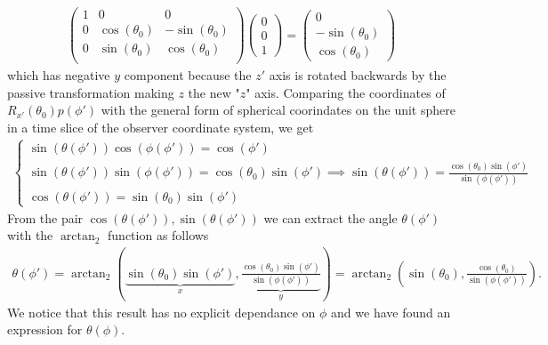 \documentclass[10pt, a4paper]{article}
\begin{document}
\begin{align*}
  \begin{pmatrix}
    1 & 0 & 0\\
    0 & \cos(\theta_0) & -\sin(\theta_0)\\
    0 & \sin(\theta_0) & \cos(\theta_0)\\
  \end{pmatrix}
  \begin{pmatrix}
    0\\
    0\\
    1
  \end{pmatrix}
  =
  \begin{pmatrix}
    0\\
    -\sin(\theta_0)\\
     \cos(\theta_0)
  \end{pmatrix}
\end{align*}
which has negative $y$ component because the $z'$ axis is rotated backwards by the passive transformation making $z$ the new "$z$" axis. Comparing the coordinates of $R_{x'}(\theta_0) p(\phi')$ with the general form of spherical coorindates on the unit sphere in a time slice of the observer coordinate system, we get
\begin{align*}
  \begin{cases}
    \sin(\theta(\phi'))\cos(\phi(\phi')) = \cos(\phi')\\
    \sin(\theta(\phi'))\sin(\phi(\phi')) = \cos(\theta_0)\sin(\phi') \implies \sin(\theta(\phi')) = \frac{\cos(\theta_0)\sin(\phi')}{\sin(\phi(\phi'))} \\
    \cos(\theta(\phi')) = \sin(\theta_0)\sin(\phi')
  \end{cases}
\end{align*}
From the pair $\cos(\theta(\phi')), \sin(\theta(\phi'))$ we can extract the angle $\theta(\phi')$ with the $\arctan_2$ function as follows
\begin{align*}
  \theta(\phi') = \arctan_2\left(\underbrace{\sin(\theta_0)\sin(\phi')}_{x}, \underbrace{\frac{\cos(\theta_0)\sin(\phi')}{\sin(\phi(\phi'))}}_y\right) = \arctan_2\left(\sin(\theta_0), \frac{\cos(\theta_0)}{\sin(\phi(\phi'))}\right).
\end{align*}
We notice that this result has no explicit dependance on $\phi$ and we have found an expression for $\theta(\phi)$. 
\end{document}
